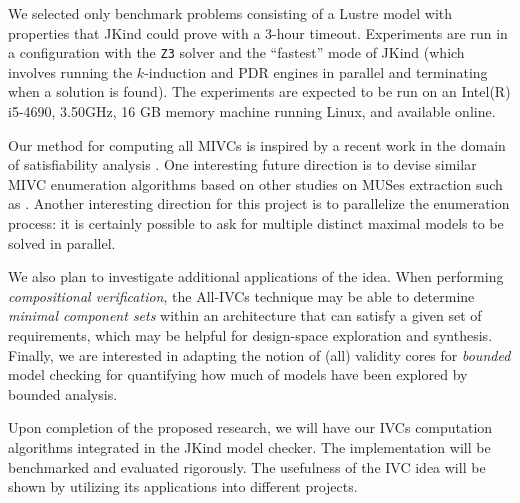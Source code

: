We selected only benchmark problems consisting of a Lustre model with
properties that JKind could prove with a 3-hour timeout.
Experiments are run in a configuration with the \texttt{Z3} solver and the ``fastest'' mode of JKind (which involves running the $k$-induction and PDR engines in parallel and terminating when a solution is found). The experiments are expected to be run on an  Intel(R) i5-4690, 3.50GHz, 16 GB memory machine running Linux, and available online.

Our method for computing all MIVCs is inspired by a recent work in the domain of satisfiability analysis \cite{marco2016fast}. One interesting future direction is to devise similar MIVC enumeration algorithms based on other studies on MUSes extraction such as \cite{nadel2014accelerated}.
Another interesting direction for this project is to parallelize the enumeration process: it is certainly possible to ask for multiple distinct maximal models to be solved in parallel.

We also plan to investigate additional applications of the idea.  When performing {\em compositional verification}, the All-IVCs technique may be able to determine {\em minimal component sets} within an architecture that can satisfy a given set of requirements, which may be helpful for design-space exploration and synthesis. Finally, we are interested in adapting the notion of (all) validity cores for \emph{bounded} model checking for quantifying how much of models have been explored by bounded analysis.

Upon completion of the proposed research, we will have our IVCs computation algorithms integrated in the JKind model checker. The implementation will be benchmarked and evaluated rigorously. The usefulness of the IVC idea will be shown by utilizing its applications into different projects.
